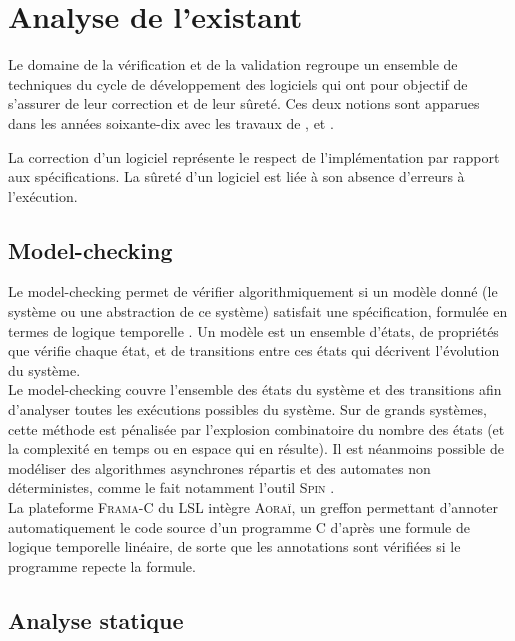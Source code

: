 
\chapter{Analyse de l'existant}


Le domaine de la vérification et de la validation regroupe un ensemble de
techniques du cycle de développement des logiciels qui ont pour objectif de
s'assurer de leur correction et de leur sûreté. Ces deux notions sont apparues
dans les années soixante-dix avec les travaux de  \cite{Dijkstra},
 \cite{Floyd} et  \cite{Hoare}.

La correction d'un logiciel représente le respect de l'implémentation par
rapport aux spécifications. La sûreté d'un logiciel est liée à son absence
d'erreurs à l'exécution.


\section{Model-checking}
\label{sec:model-checking}

Le model-checking \cite{model-checking} permet de vérifier algorithmiquement si
un modèle donné (le système ou une abstraction de ce système) satisfait une
spécification, formulée en termes de logique temporelle \cite{LTL}. Un modèle
est un ensemble d'états, de propriétés que vérifie chaque état, et de
transitions entre ces états qui décrivent l'évolution du système.\\

Le model-checking couvre l'ensemble des états du système et des transitions afin
d'analyser toutes les exécutions possibles du système. Sur de grands systèmes,
cette méthode est pénalisée par l'explosion combinatoire du nombre des états (et
la complexité en temps ou en espace qui en résulte). Il est néanmoins possible
de modéliser des algorithmes asynchrones répartis et des automates non
déterministes, comme le fait notamment l'outil \textsc{Spin} \cite{SPIN}.\\

La plateforme \textsc{Frama-C} du LSL intègre \textsc{Aoraï}, un greffon
permettant d'annoter automatiquement le code source d'un programme C d'après
une formule de logique temporelle linéaire, de sorte que les annotations sont
vérifiées si le programme repecte la formule.


\section{Analyse statique}
\label{sec:AS}

